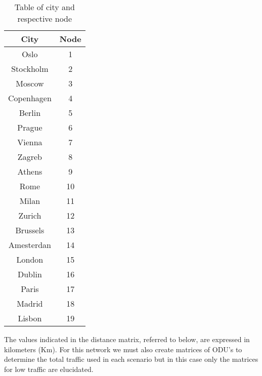 \begin{table}[h!]
\centering
\begin{tabular}{|| c | c ||}
 \hline
 City & Node \\
 \hline\hline
 Oslo & 1 \\
 Stockholm & 2 \\
 Moscow & 3 \\
 Copenhagen & 4 \\
 Berlin & 5 \\
 Prague & 6 \\
 Vienna & 7 \\
 Zagreb & 8 \\
 Athens & 9 \\
 Rome & 10 \\
 Milan & 11 \\
 Zurich & 12 \\
 Brussels & 13 \\
 Amesterdan & 14 \\
 London & 15 \\
 Dublin & 16 \\
 Paris & 17 \\
 Madrid & 18 \\
 Lisbon & 19 \\
 \hline
\end{tabular}
\caption{Table of city and respective node}
\label{city_nodes_realnet}
\end{table}


The values indicated in the distance matrix, referred to below, are expressed in kilometers (Km).
For this network we must also create matrices of ODU's to determine the total traffic used in each scenario but in this case only the matrices for low traffic are elucidated.

